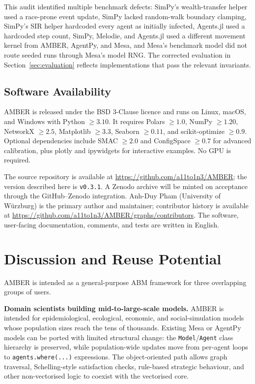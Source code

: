 \documentclass[11pt,a4paper]{article}
\begin{document}
This audit identified multiple benchmark defects: SimPy's wealth-transfer helper used a race-prone event update, SimPy lacked random-walk boundary clamping, SimPy's SIR helper hardcoded every agent as initially infected, Agents.jl used a hardcoded step count, SimPy, Melodie, and Agents.jl used a different movement kernel from AMBER, AgentPy, and Mesa, and Mesa's benchmark model did not route seeded runs through Mesa's model RNG. The corrected evaluation in Section~\ref{sec:evaluation} reflects implementations that pass the relevant invariants.

\subsection{Software Availability}

AMBER is released under the BSD 3-Clause licence and runs on Linux, macOS, and Windows with Python $\geq 3.10$. It requires Polars $\geq 1.0$, NumPy $\geq 1.20$, NetworkX $\geq 2.5$, Matplotlib $\geq 3.3$, Seaborn $\geq 0.11$, and scikit-optimize $\geq 0.9$. Optional dependencies include SMAC $\geq 2.0$ and ConfigSpace $\geq 0.7$ for advanced calibration, plus plotly and ipywidgets for interactive examples. No GPU is required.

The source repository is available at \url{https://github.com/a11to1n3/AMBER}; the version described here is \texttt{v0.3.1}. A Zenodo archive will be minted on acceptance through the GitHub--Zenodo integration. Anh-Duy Pham (University of W\"{u}rzburg) is the primary author and maintainer; contributor history is available at \url{https://github.com/a11to1n3/AMBER/graphs/contributors}. The software, user-facing documentation, comments, and tests are written in English.

\section{Discussion and Reuse Potential}

AMBER is intended as a general-purpose ABM framework for three overlapping groups of users.

\textbf{Domain scientists building mid-to-large-scale models.} AMBER is intended for epidemiological, ecological, economic, and social-simulation models whose population sizes reach the tens of thousands. Existing Mesa or AgentPy models can be ported with limited structural change: the \texttt{Model}/\texttt{Agent} class hierarchy is preserved, while population-wide updates move from per-agent loops to \texttt{agents.where(...)} expressions. The object-oriented path allows graph traversal, Schelling-style satisfaction checks, rule-based strategic behaviour, and other non-vectorised logic to coexist with the vectorised core.
\end{document}
